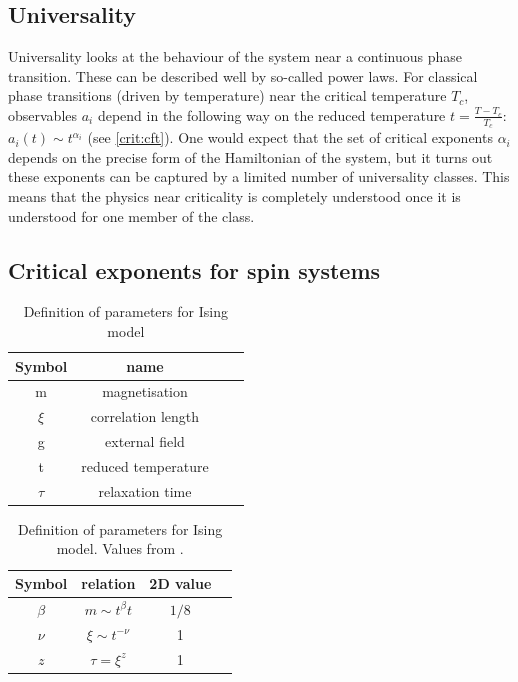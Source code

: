 \subsection{Universality}

Universality looks at the behaviour of the system near a continuous phase transition. These can be described well by so-called power laws. For classical phase transitions (driven by temperature) near the critical temperature $T_c$, observables $a_i$ depend in the following way on the reduced temperature $t=\frac{T-T_c}{T_c}$: $ a_i(t) \sim t^{\alpha_i}$ (see \cref{crit:cft}). One would expect that the set of critical exponents ${\alpha_i}$ depends on the precise form of the Hamiltonian of the system, but it turns out these exponents can be captured by a limited number of universality classes. This means that the physics near criticality is completely understood once it is understood for one member of the class.

\subsection{Critical exponents for spin systems}
\begin{table}[!ht]
  \centering
  \caption{Definition of parameters for Ising model}
  \begin{tabular}{c c c c}
    Symbol & name                \\
    \hline
    m      & magnetisation       \\
    $\xi$  & correlation length  \\
    g      & external field      \\
    t      & reduced temperature \\
    $\tau$ & relaxation time     \\
  \end{tabular}
  \label{isingtable}
\end{table}

\begin{table}[!ht]
  \centering
  \caption{Definition of parameters for Ising model. Values from \cite{Odor2004}.}
  \begin{tabular}{c c c c}
    Symbol  & relation             & 2D  value \\
    \hline
    $\beta$ & $m \sim t^{\beta} t$ & $1/8$     \\
    $\nu$   & $\xi \sim t^{-\nu}$  & 1         \\
    $z$     & $\tau = \xi^z$       & 1         \\
  \end{tabular}
  \label{isingtable2}
\end{table}

